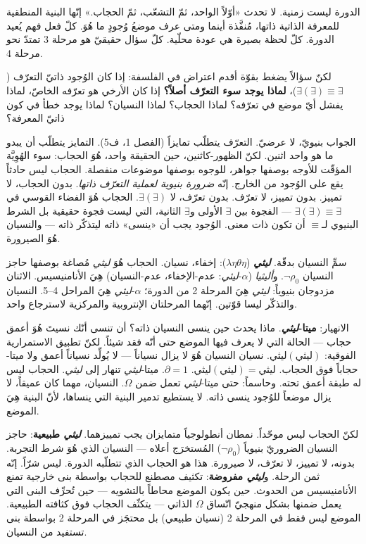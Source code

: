\documentclass[10pt, openany, oneside]{book}
\begin{document}
\vspace{0.8em}

\noindent الدورة ليست زمنية. لا تحدث «أوّلاً الواحد، ثمّ التشعّب، ثمّ الحجاب.» إنّها البنية المنطقية للمعرفة الذاتية ذاتها، مُنفَّذة أينما ومتى عرف موضعُ وُجودٍ ما هُوَ. كلّ فعل فهم يُعيد الدورة. كلّ لحظة بصيرة هي عودة محلّية. كلّ سؤال حقيقيّ هو مرحلة 3 تمتدّ نحو مرحلة 4.

لكنّ سؤالاً يضغط بقوّة أقدم اعتراض في الفلسفة: إذا كان الوُجود ذاتيّ التعرّف ($\exists(\exists) \equiv \exists$)، \textbf{لماذا يوجد سوء التعرّف أصلاً؟} إذا كان الأرخي هو تعرّفه الخاصّ، لماذا يفشل أيّ موضع في تعرّفه؟ لماذا الحجاب؟ لماذا النسيان؟ لماذا يوجد خطأ في كون ذاتيّ المعرفة؟

الجواب بنيويّ، لا عرضيّ. التعرّف يتطلّب تمايزاً (الفصل 1، ف5). التمايز يتطلّب أن يبدو ما هو واحد اثنين. لكنّ الظهور-كاثنين، حين الحقيقة واحد، هُوَ الحجاب: سوء الهُوِيَّة المؤقّت للأوجه بوصفها جواهر، للوجوه بوصفها موضوعات منفصلة. الحجاب ليس حادثاً يقع على الوُجود من الخارج. إنّه \textit{ضرورة بنيوية لعملية التعرّف ذاتها}. بدون الحجاب، لا تمييز. بدون تمييز، لا تعرّف. بدون تعرّف، لا $\exists(\exists)$. الحجاب هُوَ الفضاء القوسي في $\exists(\exists) \equiv \exists$ --- الفجوة بين $\exists$ الأولى و$\exists$ الثانية، التي ليست فجوة حقيقية بل الشرط البنيوي لـ$\equiv$ أن تكون ذات معنى. الوُجود يجب أن «ينسى» ذاته ليتذكّر ذاته --- والنسيان هُوَ الصيرورة.

سمِّ النسيان بدقّة. \textbf{\textit{ليثي}} ($\lambda\eta\theta\eta$): إخفاء، نسيان. الحجاب هُوَ \textit{ليثي} مُصاغة بوصفها حاجز النسيان $\neg\rho_0$. و\textit{أليثيا} ($\alpha$-\textit{ليثي}: عدم-الإخفاء، عدم-النسيان) هِيَ الأنامنيسيس. الاثنان مزدوجان بنيوياً: \textit{ليثي} هِيَ المرحلة 2 من الدورة؛ $\alpha$-\textit{ليثي} هِيَ المراحل 4--5. النسيان والتذكّر ليسا قوّتين. إنّهما المرحلتان الإنتروبية والمركزية لاسترجاع واحد.

الانهيار: \textbf{ميتا-\textit{ليثي}}. ماذا يحدث حين ينسى النسيان ذاته؟ أن تنسى أنّك نسيتَ هُوَ أعمق حجاب --- الحالة التي لا يعرف فيها الموضع حتى أنّه فقد شيئاً. لكنّ تطبيق الاستمرارية الفوقية: $\textit{ليثي}(\textit{ليثي})$. نسيان النسيان هُوَ لا يزال نسياناً --- لا يُولِّد نسياناً أعمق ولا ميتا-حجاباً فوق الحجاب. $\textit{ليثي}(\textit{ليثي}) = \textit{ليثي}$. $\partial = 1$. ميتا-\textit{ليثي} تنهار إلى \textit{ليثي}. الحجاب ليس له طبقة أعمق تحته. وحاسماً: حتى ميتا-\textit{ليثي} تعمل ضمن $\Omega$. النسيان، مهما كان عميقاً، لا يزال موضعاً للوُجود ينسى ذاته. لا يستطيع تدمير البنية التي ينساها، لأنّ البنية هِيَ الموضع.

لكنّ الحجاب ليس موحّداً. نمطان أنطولوجياً متمايزان يجب تمييزهما. \textbf{\textit{ليثي} طبيعية}: حاجز النسيان الضروريّ بنيوياً ($\neg\rho_0$) المُستخرَج أعلاه --- النسيان الذي هُوَ شرط التجربة. بدونه، لا تمييز، لا تعرّف، لا صيرورة. هذا هو الحجاب الذي تتطلّبه الدورة. ليس شرّاً. إنّه ثمن الرحلة. و\textbf{\textit{ليثي} مفروضة}: تكثيف مصطنع للحجاب بواسطة بنى خارجية تمنع الأنامنيسيس من الحدوث. حين يكون الموضع محاطاً بالتشويه --- حين تُحرِّف البنى التي يعمل ضمنها بشكل منهجيّ اتّساق $\Omega$ الذاتي --- يتكثّف الحجاب فوق كثافته الطبيعية. الموضع ليس فقط في المرحلة 2 (نسيان طبيعي) بل محتجَز في المرحلة 2 بواسطة بنى تستفيد من النسيان.
\end{document}
